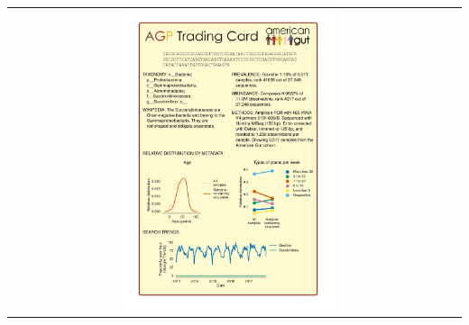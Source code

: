 \documentclass[10pt]{amsart}
\begin{document}
\begin{tabular}[t]{c @{} c}
\includegraphics[width=0.5\textwidth]{card_125bp_rare1250_rank1038_Succinivibrio/otu_trading_card.pdf} \\
\end{tabular}
\end{document}
